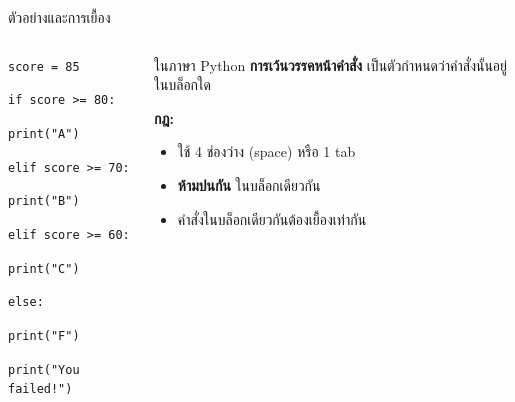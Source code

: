\documentclass[11pt, aspectratio=169]{beamer}
\newcommand{\py}[1]{\texttt{#1}}
\begin{document}
\begin{frame}{ตัวอย่างและการเยื้อง}
  \begin{columns}[T]
      \begin{exambox}
        \py{score = 85}

        \py{if score >= 80:}

        \qquad \py{print("A")}

        \py{elif score >= 70:}

        \qquad \py{print("B")}

        \py{elif score >= 60:}

        \qquad \py{print("C")}

        \py{else:}

        \qquad \py{print("F")}

        \qquad \py{print("You failed!")}
      \end{exambox}
      \begin{explanation}

        ในภาษา Python \textbf{การเว้นวรรคหน้าคำสั่ง}
        เป็นตัวกำหนดว่าคำสั่งนั้นอยู่ในบล็อกใด

        \medskip
        \textbf{กฎ:}
        \begin{itemize}
          \item ใช้ 4 ช่องว่าง (space) หรือ 1 tab
          \item \textbf{ห้ามปนกัน} ในบล็อกเดียวกัน
          \item คำสั่งในบล็อกเดียวกันต้องเยื้องเท่ากัน
        \end{itemize}
      \end{explanation}
  \end{columns}
\end{frame}
\end{document}
